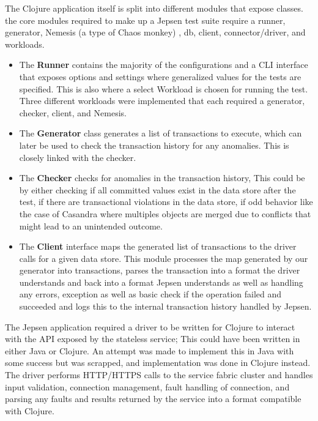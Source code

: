 \documentclass[a4paper,10pt,titlepage]{report}
\begin{document}
       
The Clojure application itself is split into different modules that expose classes. the core modules required to make up a Jepsen test suite require a runner, generator, Nemesis (a type of Chaos monkey) \cite{Choasmonkey}, db, client, connector/driver, and workloads.
\begin{itemize}
   \item The \textbf{Runner} contains the majority of the configurations and a CLI interface that exposes options and settings where generalized values for the tests are specified. This is also where a select Workload is chosen for running the test. Three different workloads were implemented that each required a generator, checker, client, and Nemesis.
       
  \item  The \textbf{Generator} class generates a list of transactions to execute, which can later be used to check the transaction history for any anomalies. This is closely linked with the checker.
       
  \item  The \textbf{Checker} checks for anomalies in the transaction history, This could be by either checking if all committed values exist in the data store after the test, if there are transactional violations in the data store, if odd behavior like the case of Casandra where multiples objects are merged due to conflicts that might lead to an unintended outcome. 
       
 \item  The \textbf{Client} interface maps the generated list of transactions to the driver calls for a given data store. This module processes the map generated by our generator into transactions, parses the transaction into a format the driver understands and back into a format Jepsen understands as well as handling any errors, exception as well as basic check if the operation failed and succeeded and logs this to the internal transaction history handled by Jepsen.
\end{itemize}
       
The Jepsen application required a driver to be written for Clojure to interact with the API exposed by the stateless service; This could have been written in either Java or Clojure. An attempt was made to implement this in Java with some success but was scrapped, and implementation was done in Clojure instead. The driver performs HTTP/HTTPS calls to the service fabric cluster and handles input validation, connection management, fault handling of connection, and parsing any faults and results returned by the service into a format compatible with Clojure.
       
\end{document}
